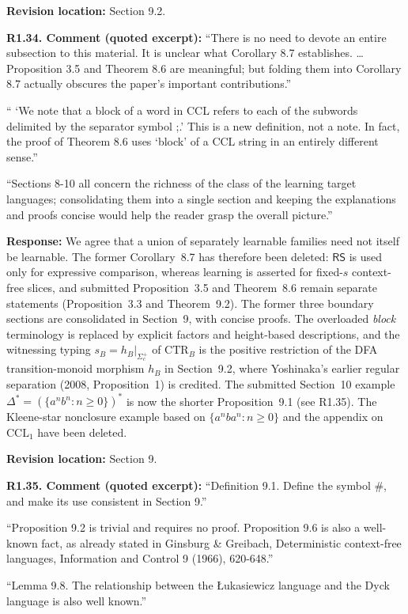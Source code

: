 \documentclass[
  10pt,
  a4paper,
]{article}
\begin{document}
\textbf{Revision location:} Section 9.2.


\textbf{R1.34. Comment (quoted excerpt):} ``There is no need to devote an
entire subsection to this material. It is unclear what Corollary 8.7
establishes. \ldots{} Proposition 3.5 and Theorem 8.6 are meaningful;
but folding them into Corollary 8.7 actually obscures the paper's
important contributions.''

`` `We note that a block of a word in CCL refers to each of the subwords
delimited by the separator symbol ;.' This is a new definition, not a
note. In fact, the proof of Theorem 8.6 uses `block' of a CCL string in
an entirely different sense.''

``Sections 8-10 all concern the richness of the class of the learning
target languages; consolidating them into a single section and keeping
the explanations and proofs concise would help the reader grasp the
overall picture.''

\textbf{Response:} We agree that a union of separately
learnable families need not itself be learnable.  The former Corollary~8.7
has therefore been deleted: $\mathsf{RS}$ is used only for expressive
comparison, whereas learning is asserted for fixed-$s$ context-free
slices, and submitted Proposition~3.5 and Theorem~8.6 remain separate
statements (Proposition~3.3 and Theorem~9.2).
The former three boundary sections are consolidated in Section~9, with
concise proofs. The overloaded \emph{block} terminology is replaced by
explicit factors and height-based descriptions, and the witnessing
typing $s_B=h_B|_{\Sigma_c^+}$ of $\mathrm{CTR}_B$ is the
positive restriction of the DFA transition-monoid morphism $h_B$
in Section~9.2, where Yoshinaka's earlier regular separation
(2008, Proposition~1) is credited. The submitted Section~10 example
$\Delta^*=(\{a^nb^n:n\ge0\})^*$ is now the shorter Proposition~9.1
(see R1.35). The Kleene-star nonclosure example based on
$\{a^n b a^n:n\ge0\}$ and the appendix on $\mathrm{CCL}_1$ have been
deleted.

\textbf{Revision location:} Section 9.


\textbf{R1.35. Comment (quoted excerpt):} ``Definition 9.1. Define the symbol
\#, and make its use consistent in Section 9.''

``Proposition 9.2 is trivial and requires no proof. Proposition 9.6 is
also a well-known fact, as already stated in Ginsburg \& Greibach,
Deterministic context-free languages, Information and Control 9 (1966),
620-648.''

``Lemma 9.8. The relationship between the Łukasiewicz language and the
Dyck language is also well known.''
\end{document}
